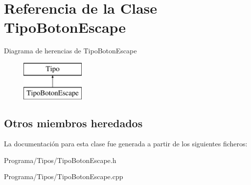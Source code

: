 \hypertarget{class_tipo_boton_escape}{\section{Referencia de la Clase Tipo\-Boton\-Escape}
\label{class_tipo_boton_escape}
}
Diagrama de herencias de Tipo\-Boton\-Escape\begin{figure}[H]
\begin{center}
\leavevmode
\includegraphics[height=2.000000cm]{class_tipo_boton_escape}
\end{center}
\end{figure}
\subsection*{Otros miembros heredados}


La documentación para esta clase fue generada a partir de los siguientes ficheros\-:\begin{DoxyCompactItemize}
\item 
Programa/\-Tipos/Tipo\-Boton\-Escape.\-h\item 
Programa/\-Tipos/Tipo\-Boton\-Escape.\-cpp\end{DoxyCompactItemize}

